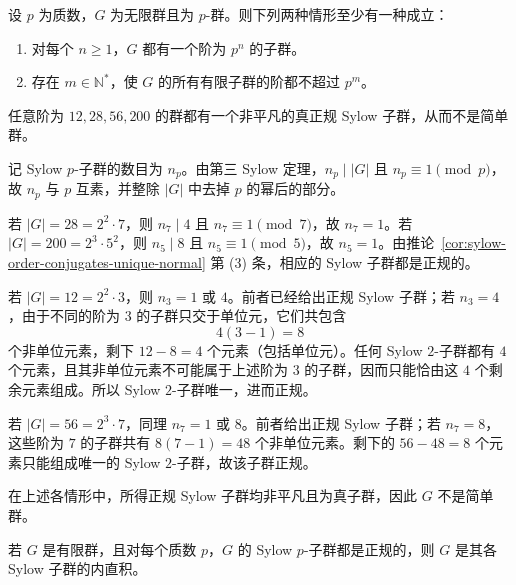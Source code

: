 \begin{proposition}\label{prop:infinite-p-group-finite-subgroup-orders}
设 $p$ 为质数，$G$ 为无限群且为 $p$-群。则下列两种情形至少有一种成立：
\begin{enumerate}[label=(\arabic*)]
  \item 对每个 $n\geq1$，$G$ 都有一个阶为 $p^n$ 的子群。
  \item 存在 $m\in\mathbb N^*$，使 $G$ 的所有有限子群的阶都不超过 $p^m$。
\end{enumerate}
\end{proposition}

\begin{proposition}\label{prop:normal-sylow-orders-12-28-56-200}
任意阶为 $12,28,56,200$ 的群都有一个非平凡的真正规 Sylow 子群，从而不是简单群。
\end{proposition}

\begin{purpleproof}
记 Sylow $p$-子群的数目为 $n_p$。由第三 Sylow 定理，$n_p\mid |G|$ 且 $n_p\equiv1\pmod p$，故 $n_p$ 与 $p$ 互素，并整除 $|G|$ 中去掉 $p$ 的幂后的部分。

若 $|G|=28=2^2\cdot7$，则 $n_7\mid4$ 且 $n_7\equiv1\pmod7$，故 $n_7=1$。若 $|G|=200=2^3\cdot5^2$，则 $n_5\mid8$ 且 $n_5\equiv1\pmod5$，故 $n_5=1$。由推论~\ref{cor:sylow-order-conjugates-unique-normal} 第 (3) 条，相应的 Sylow 子群都是正规的。

若 $|G|=12=2^2\cdot3$，则 $n_3=1$ 或 $4$。前者已经给出正规 Sylow 子群；若 $n_3=4$，由于不同的阶为 $3$ 的子群只交于单位元，它们共包含
\[
  4(3-1)=8
\]
个非单位元素，剩下 $12-8=4$ 个元素（包括单位元）。任何 Sylow $2$-子群都有 $4$ 个元素，且其非单位元素不可能属于上述阶为 $3$ 的子群，因而只能恰由这 $4$ 个剩余元素组成。所以 Sylow $2$-子群唯一，进而正规。

若 $|G|=56=2^3\cdot7$，同理 $n_7=1$ 或 $8$。前者给出正规 Sylow 子群；若 $n_7=8$，这些阶为 $7$ 的子群共有 $8(7-1)=48$ 个非单位元素。剩下的 $56-48=8$ 个元素只能组成唯一的 Sylow $2$-子群，故该子群正规。

在上述各情形中，所得正规 Sylow 子群均非平凡且为真子群，因此 $G$ 不是简单群。
\end{purpleproof}

\begin{proposition}\label{prop:finite-group-normal-sylow-direct-product}
若 $G$ 是有限群，且对每个质数 $p$，$G$ 的 Sylow $p$-子群都是正规的，则 $G$ 是其各 Sylow 子群的内直积。
\end{proposition}

